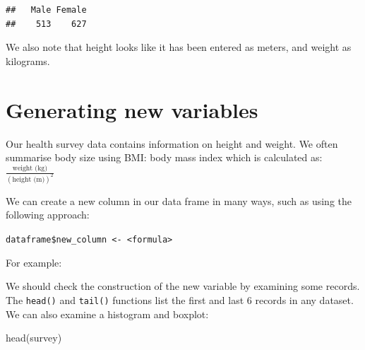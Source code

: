 \documentclass[
]{memoir}
\newenvironment{Shaded}{\begin{snugshade}}{\end{snugshade}}
\newcommand{\DecValTok}[1]{\textcolor[rgb]{0.00,0.00,0.81}{#1}}
\newcommand{\FunctionTok}[1]{\textcolor[rgb]{0.00,0.00,0.00}{#1}}
\newcommand{\NormalTok}[1]{#1}
\newcommand{\OtherTok}[1]{\textcolor[rgb]{0.56,0.35,0.01}{#1}}
\newcommand{\SpecialCharTok}[1]{\textcolor[rgb]{0.00,0.00,0.00}{#1}}
\begin{document}
\begin{verbatim}
##   Male Female 
##    513    627
\end{verbatim}

We also note that height looks like it has been entered as meters, and weight as kilograms.

\hypertarget{generating-new-variables}{%
\section{Generating new variables}\label{generating-new-variables}}

Our health survey data contains information on height and weight. We often summarise body size using BMI: body mass index which is calculated as: \(\frac{\text{weight (kg)}}{(\text{height (m)})^2}\)

We can create a new column in our data frame in many ways, such as using the following approach:

\texttt{dataframe\$new\_column\ \textless{}-\ \textless{}formula\textgreater{}}

For example:

\begin{Shaded}
\end{Shaded}

We should check the construction of the new variable by examining some records. The \texttt{head()} and \texttt{tail()} functions list the first and last 6 records in any dataset. We can also examine a histogram and boxplot:

\begin{Shaded}
\begin{Highlighting}[]
\FunctionTok{head}\NormalTok{(survey)}
\end{Highlighting}
\end{Shaded}

 
  \providecommand{\huxb}[2]{\arrayrulecolor[RGB]{#1}\global\arrayrulewidth=#2pt}
  \providecommand{\huxvb}[2]{\color[RGB]{#1}\vrule width #2pt}
  \providecommand{\huxtpad}[1]{\rule{0pt}{#1}}
  \providecommand{\huxbpad}[1]{\rule[-#1]{0pt}{#1}}
\end{document}
